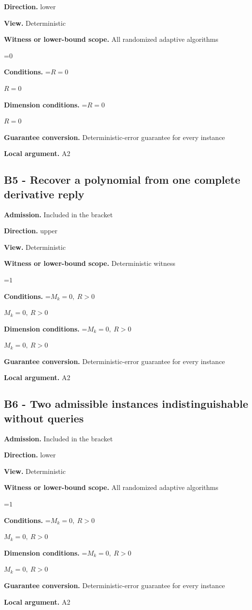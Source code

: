 \documentclass[10pt,a4paper]{article}
\newcommand{\AtlasMath}[1]{\par\begingroup\centering\setbox0=\hbox{$\displaystyle #1$}\ifdim\wd0>1.4\linewidth\typeout{ATLAS WIDE FORMULA: \the\wd0}\fi\ifdim\wd0>\linewidth\resizebox{\linewidth}{!}{\box0}\else\box0\fi\par\endgroup}
\newcommand{\AtlasInlineMath}[1]{\begingroup\setbox0=\hbox{$#1$}\ifdim\wd0>.4\linewidth\endgroup\AtlasMath{#1}\else\endgroup$#1$\fi}
\begin{document}
\textbf{Direction.} lower

\textbf{View.} Deterministic

\textbf{Witness or lower-bound scope.} All randomized adaptive algorithms

\AtlasMath{0}
\textbf{Conditions.} \AtlasInlineMath{R=0}

\textbf{Dimension conditions.} \AtlasInlineMath{R=0}

\textbf{Guarantee conversion.} Deterministic-error guarantee for every instance

\textbf{Local argument.} A2

\subsection{B5 - Recover a polynomial from one complete derivative reply}
\textbf{Admission.} Included in the bracket

\textbf{Direction.} upper

\textbf{View.} Deterministic

\textbf{Witness or lower-bound scope.} Deterministic witness

\AtlasMath{1}
\textbf{Conditions.} \AtlasInlineMath{M_k=0,\ R>0}

\textbf{Dimension conditions.} \AtlasInlineMath{M_k=0,\ R>0}

\textbf{Guarantee conversion.} Deterministic-error guarantee for every instance

\textbf{Local argument.} A2

\subsection{B6 - Two admissible instances indistinguishable without queries}
\textbf{Admission.} Included in the bracket

\textbf{Direction.} lower

\textbf{View.} Deterministic

\textbf{Witness or lower-bound scope.} All randomized adaptive algorithms

\AtlasMath{1}
\textbf{Conditions.} \AtlasInlineMath{M_k=0,\ R>0}

\textbf{Dimension conditions.} \AtlasInlineMath{M_k=0,\ R>0}

\textbf{Guarantee conversion.} Deterministic-error guarantee for every instance

\textbf{Local argument.} A2
\end{document}
